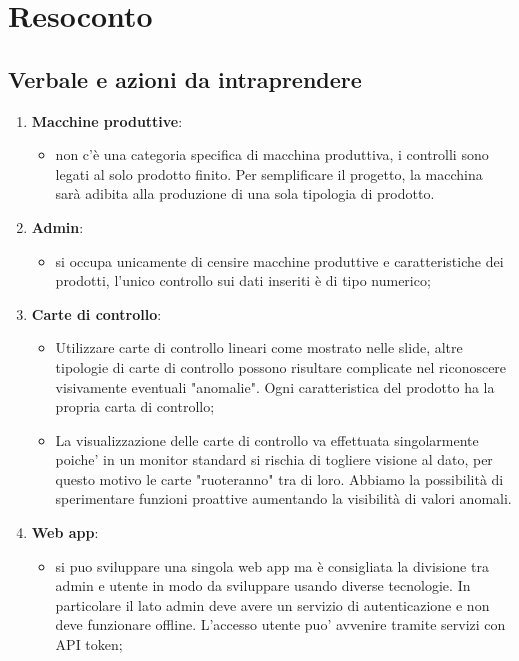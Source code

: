 \section{Resoconto}
\subsection{Verbale e azioni da intraprendere}

\begin{enumerate}
	\item \textbf{Macchine produttive}:
		\begin{itemize}
			\item non c'è una categoria specifica di macchina produttiva, i controlli sono legati al  solo prodotto finito. Per semplificare il progetto, la macchina sarà adibita alla produzione di una sola tipologia di prodotto.
		\end{itemize}
	\item \textbf{Admin}:
		\begin{itemize}
			\item si occupa unicamente di censire macchine produttive e caratteristiche dei prodotti, l'unico controllo sui dati inseriti è di tipo numerico;
		\end{itemize}
	\item \textbf{Carte di controllo}:
		\begin{itemize}
			\item Utilizzare carte di controllo lineari come mostrato nelle slide, altre tipologie di carte di controllo possono risultare complicate nel riconoscere visivamente eventuali "anomalie". Ogni caratteristica del prodotto ha la propria carta di controllo;
			\item La visualizzazione delle carte di controllo va effettuata singolarmente poiche' in un monitor standard si rischia di togliere visione al dato, per questo motivo le carte "ruoteranno" tra di loro. Abbiamo la possibilità di sperimentare funzioni proattive aumentando la visibilità di valori anomali.
		\end{itemize}
	\item \textbf{Web app}:
		\begin{itemize}
			\item si puo sviluppare una singola web app\glo{} ma è consigliata la divisione tra admin e utente in modo da sviluppare usando diverse tecnologie. In particolare il lato admin deve avere un servizio di autenticazione e non deve funzionare offline. L'accesso utente puo' avvenire tramite servizi con API token;

\end{itemize}
\end{enumerate}
